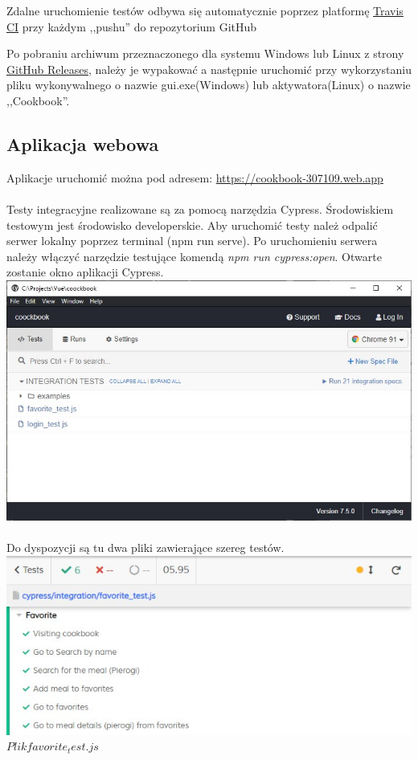 \documentclass[12pt,a4paper]{article}
\begin{document}
			\indent Zdalne uruchomienie testów odbywa się automatycznie poprzez platformę \href{https://www.travis-ci.com/github/MacKarp/Cookbook}{Travis CI} 
			przy każdym ,,pushu'' do repozytorium GitHub
			 
			\indent Po pobraniu archiwum przeznaczonego dla systemu Windows lub Linux z strony \href{https://github.com/MacKarp/Cookbook/releases}{GitHub Releases},
			należy je wypakować a następnie uruchomić przy wykorzystaniu pliku wykonywalnego o nazwie gui.exe(Windows) lub aktywatora(Linux) o nazwie ,,Cookbook''. 		
		\subsection{Aplikacja webowa}	 
		\indent Aplikacje uruchomić można pod adresem: \href{https://cookbook-307109.web.app}{https://cookbook-307109.web.app} \\\\
	\indent Testy integracyjne realizowane są za pomocą narzędzia Cypress. Środowiskiem testowym jest środowisko developerskie. Aby uruchomić testy należ odpalić serwer lokalny poprzez terminal (npm run serve). Po uruchomieniu serwera należy włączyć narzędzie testujące komendą \textit{npm run cypress:open}. Otwarte zostanie okno aplikacji Cypress.\\
		\newline
	\includegraphics[width=1.0\linewidth]{img/cypress.jpg}\\\\
	\newline
	Do dyspozycji są tu dwa pliki zawierające szereg testów.
	\newline
	\newline
	\includegraphics[width=1.0\linewidth]{img/cypres1.jpg}\\
	\newline
	$Plik favorite_test.js$
	
\end{document}
